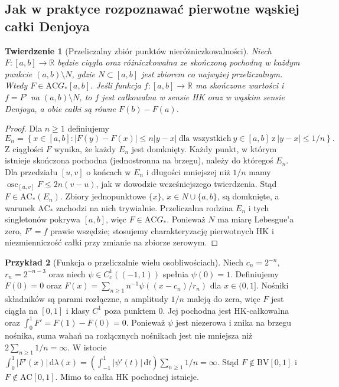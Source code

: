 \documentclass[11pt,a4paper]{article}
\numberwithin{equation}{section}
\theoremstyle{plain}
\newtheorem{twierdzenie}{Twierdzenie}[section]
\theoremstyle{definition}
\newtheorem{przyklad}[twierdzenie]{Przykład}
\theoremstyle{remark}
\newcommand{\R}{\mathbb R}
\newcommand{\osc}{\operatorname{osc}}
\newcommand{\AC}{\mathrm{AC}}
\newcommand{\BV}{\mathrm{BV}}
\begin{document}
\subsection*{Jak w praktyce rozpoznawać pierwotne wąskiej całki Denjoya}
\begin{twierdzenie}[Przeliczalny zbiór punktów nieróżniczkowalności]\label{tw:denjoy-countable}
Niech $F:[a,b]\to\R$ będzie ciągła oraz różniczkowalna ze skończoną pochodną w każdym punkcie $(a,b)\setminus N$, gdzie $N\subset[a,b]$ jest zbiorem co najwyżej przeliczalnym. Wtedy $F\in\AC G_*[a,b]$. Jeśli funkcja $f:[a,b]\to\R$ ma skończone wartości i $f=F'$ na $(a,b)\setminus N$, to $f$ jest całkowalna w sensie HK oraz w wąskim sensie Denjoya, a obie całki są równe $F(b)-F(a)$.
\end{twierdzenie}
\begin{proof}
Dla $n\ge1$ definiujemy
\[
 E_n=\left\{x\in[a,b]: |F(y)-F(x)|\le n|y-x|
 \ \text{dla wszystkich}\ y\in[a,b]\ \text{z}\ |y-x|\le1/n\right\}.
\]
Z ciągłości $F$ wynika, że każdy $E_n$ jest domknięty. Każdy punkt, w którym istnieje skończona pochodna (jednostronna na brzegu), należy do któregoś $E_n$. Dla przedziału $[u,v]$ o końcach w $E_n$ i długości mniejszej niż $1/n$ mamy
$\osc_{[u,v]}F\le2n(v-u)$, jak w dowodzie wcześniejszego twierdzenia. Stąd $F\in\AC_*(E_n)$. Zbiory jednopunktowe $\{x\}$, $x\in N\cup\{a,b\}$, są domknięte, a warunek $\AC_*$ zachodzi na nich trywialnie. Przeliczalna rodzina $E_n$ i tych singletonów pokrywa $[a,b]$, więc $F\in\AC G_*$. Ponieważ $N$ ma miarę Lebesgue'a zero, $F'=f$ prawie wszędzie; stosujemy charakteryzację pierwotnych HK i niezmienniczość całki przy zmianie na zbiorze zerowym.
\end{proof}
\begin{przyklad}[Funkcja o przeliczalnie wielu osobliwościach]
Niech $c_n=2^{-n}$, $r_n=2^{-n-3}$ oraz niech $\psi\in C_c^1((-1,1))$ spełnia $\psi(0)=1$. Definiujemy
$F(0)=0$ oraz $F(x)=\sum_{n\ge1}n^{-1}\psi((x-c_n)/r_n)$ dla $x\in(0,1]$. Nośniki składników są parami rozłączne, a amplitudy $1/n$ maleją do zera, więc $F$ jest ciągła na $[0,1]$ i klasy $C^1$ poza punktem $0$. Jej pochodna jest HK-całkowalna oraz $\int_0^1F'=F(1)-F(0)=0$. Ponieważ $\psi$ jest niezerowa i znika na brzegu nośnika, suma wahań na rozłącznych nośnikach jest nie mniejsza niż $2\sum_{n\ge1}1/n=\infty$. W istocie $\int_0^1|F'(x)|\,\mathrm d\lambda(x)=\left(\int_{-1}^1|\psi'(t)|\,\mathrm dt\right)\sum_{n\ge1}1/n=\infty$. Stąd $F\notin\BV[0,1]$ i $F\notin\AC[0,1]$. Mimo to całka HK pochodnej istnieje.
\end{przyklad}
\end{document}
